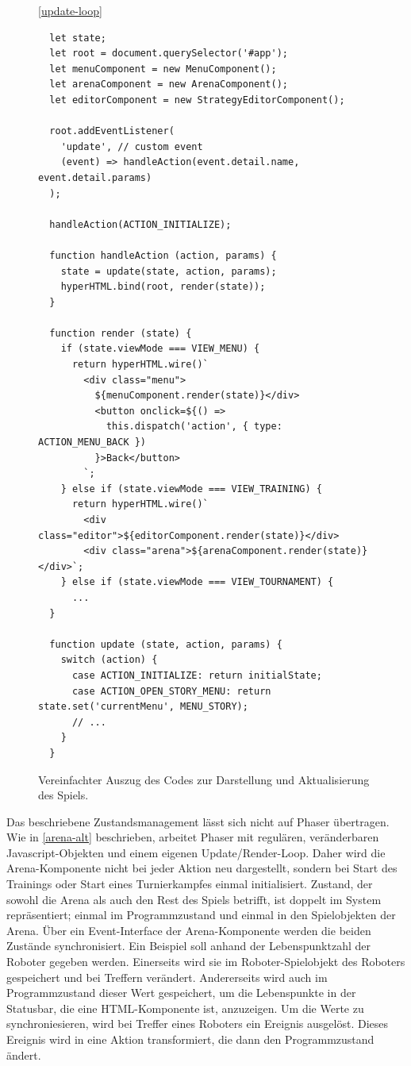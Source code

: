 \begin{figure}
  \ref{update-loop}

  \caption{Vereinfachter Auszug des Codes zur Darstellung und Aktualisierung des Spiels.}

  \begin{lstlisting}
  let state;
  let root = document.querySelector('#app');
  let menuComponent = new MenuComponent();
  let arenaComponent = new ArenaComponent();
  let editorComponent = new StrategyEditorComponent();

  root.addEventListener(
    'update', // custom event
    (event) => handleAction(event.detail.name, event.detail.params)
  );

  handleAction(ACTION_INITIALIZE);

  function handleAction (action, params) {
    state = update(state, action, params);
    hyperHTML.bind(root, render(state));
  }

  function render (state) {
    if (state.viewMode === VIEW_MENU) {
      return hyperHTML.wire()`
        <div class="menu">
          ${menuComponent.render(state)}</div>
          <button onclick=${() => 
            this.dispatch('action', { type: ACTION_MENU_BACK })
          }>Back</button>
        `;
    } else if (state.viewMode === VIEW_TRAINING) {
      return hyperHTML.wire()`
        <div class="editor">${editorComponent.render(state)}</div>
        <div class="arena">${arenaComponent.render(state)}</div>`;
    } else if (state.viewMode === VIEW_TOURNAMENT) {
      ...
  }

  function update (state, action, params) {
    switch (action) {
      case ACTION_INITIALIZE: return initialState;
      case ACTION_OPEN_STORY_MENU: return state.set('currentMenu', MENU_STORY);
      // ...
    }
  }
  \end{lstlisting}
\end{figure}

Das beschriebene Zustandsmanagement lässt sich nicht auf Phaser übertragen. Wie in \ref{arena-alt}
beschrieben, arbeitet Phaser mit regulären, veränderbaren Javascript-Objekten und einem eigenen
Update/Render-Loop. Daher wird die Arena-Komponente nicht bei jeder Aktion neu dargestellt, sondern
bei Start des Trainings oder Start eines Turnierkampfes einmal initialisiert. Zustand, der sowohl
die Arena als auch den Rest des Spiels betrifft, ist doppelt im System repräsentiert; einmal im
Programmzustand und einmal in den Spielobjekten der Arena. Über ein Event-Interface der
Arena-Komponente werden die beiden Zustände synchronisiert. Ein Beispiel soll anhand der
Lebenspunktzahl der Roboter gegeben werden. Einerseits wird sie im Roboter-Spielobjekt des Roboters
gespeichert und bei Treffern verändert. Andererseits wird auch im Programmzustand dieser Wert
gespeichert, um die Lebenspunkte in der Statusbar, die eine HTML-Komponente ist, anzuzeigen. Um die
Werte zu synchroniesieren, wird bei Treffer eines Roboters ein Ereignis ausgelöst. Dieses Ereignis
wird in eine Aktion transformiert, die dann den Programmzustand ändert.


